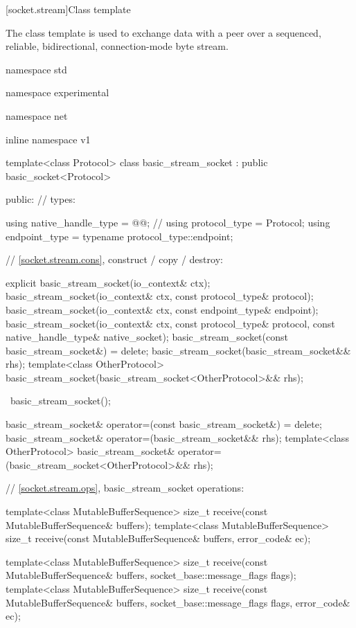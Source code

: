 %
[socket.stream]{Class template }

\pnum
The class template  is used to exchange data with a peer over a sequenced, reliable, bidirectional, connection-mode byte stream.

\begin{codeblock}
namespace std {
namespace experimental {
namespace net {
inline namespace v1 {

  template<class Protocol>
  class basic_stream_socket : public basic_socket<Protocol>
  {
  public:
    // types:

    using native_handle_type = @@; // \nativeref
    using protocol_type = Protocol;
    using endpoint_type = typename protocol_type::endpoint;

    // \ref{socket.stream.cons}, construct / copy / destroy:

    explicit basic_stream_socket(io_context& ctx);
    basic_stream_socket(io_context& ctx, const protocol_type& protocol);
    basic_stream_socket(io_context& ctx, const endpoint_type& endpoint);
    basic_stream_socket(io_context& ctx, const protocol_type& protocol,
                        const native_handle_type& native_socket);
    basic_stream_socket(const basic_stream_socket&) = delete;
    basic_stream_socket(basic_stream_socket&& rhs);
    template<class OtherProtocol>
      basic_stream_socket(basic_stream_socket<OtherProtocol>&& rhs);

    ~basic_stream_socket();

    basic_stream_socket& operator=(const basic_stream_socket&) = delete;
    basic_stream_socket& operator=(basic_stream_socket&& rhs);
    template<class OtherProtocol>
      basic_stream_socket& operator=(basic_stream_socket<OtherProtocol>&& rhs);

    // \ref{socket.stream.ops}, basic_stream_socket operations:

    template<class MutableBufferSequence>
      size_t receive(const MutableBufferSequence& buffers);
    template<class MutableBufferSequence>
      size_t receive(const MutableBufferSequence& buffers,
                     error_code& ec);

    template<class MutableBufferSequence>
      size_t receive(const MutableBufferSequence& buffers,
                     socket_base::message_flags flags);
    template<class MutableBufferSequence>
      size_t receive(const MutableBufferSequence& buffers,
                     socket_base::message_flags flags, error_code& ec);

}}}}}
\end{codeblock}
